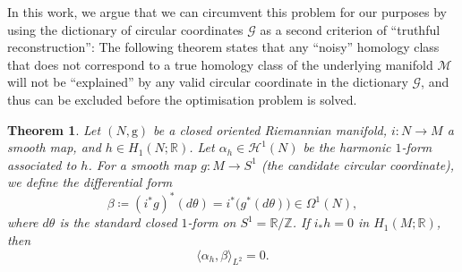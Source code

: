 \documentclass[a4paper,11pt, DIV=10]{scrartcl}
\numberwithin{equation}{section}
\newtheorem{theorem}{Theorem}[section]
\theoremstyle{definition}
\theoremstyle{remark}
\newcommand{\mc}[1]{\mathcal{#1}}
\begin{document}
In this work, we argue that we can circumvent this problem for our purposes by using the dictionary of circular coordinates $\mathcal{G}$ as a second criterion of \enquote{truthful reconstruction}:
The following theorem states that any \enquote{noisy} homology class that does not correspond to a true homology class of the underlying manifold $\mc{M}$ will not be \enquote{explained} by any valid circular coordinate in the dictionary $\mathcal{G}$, and thus can be excluded before the optimisation problem is solved.
\begin{theorem}
Let $(N,\mathrm g)$ be a closed oriented Riemannian manifold, $i\colon N\to M$ a smooth map, and
$h\in H_1(N;\mathbb R)$.  
Let $\alpha_h\in\mathcal H^1(N)$ be the harmonic $1$-form associated to $h$. %
For a smooth map $g\colon M\to S^1$ (the candidate circular coordinate), we define the differential form
\begin{equation}
\beta\coloneq(i^*g)^*(d\theta)=i^* \bigl(g^*(d\theta)\bigr)\in\Omega^1(N),
\end{equation}
where $d\theta$ is the standard closed $1$-form on $S^1=\mathbb R/\mathbb Z$.
If $i_*h=0$ in $H_1(M;\mathbb R)$, then
\begin{equation}
\langle \alpha_h,\beta\rangle_{L^2}=0.
\end{equation}
\end{theorem}
\end{document}
